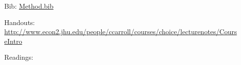 
\begin{itemize}
\item[Bib:] \href{http://www.econ2.jhu.edu/people/ccarroll/courses/choice/Syllabus/Method.bib}{Method.bib}
\item[Handouts:]  \url{http://www.econ2.jhu.edu/people/ccarroll/courses/choice/lecturenotes/CourseIntro}
\item[Readings:]
\end{itemize}


\begin{itemize}
\reqd \cite{summersIllusion}
\reqd \cite{acemogluCrisis}
\reqd \cite{keynesMaster}
\reqd \cite{krugmanHistory}
\reqd \cite{caballeroPretense}
\reqd \cite{rodrikRules}
\reqd \cite{barberaFight}
\reqd \cite{romerTrouble}
\reqd \cite{kocherlakotaTrouble}
\end{itemize}

